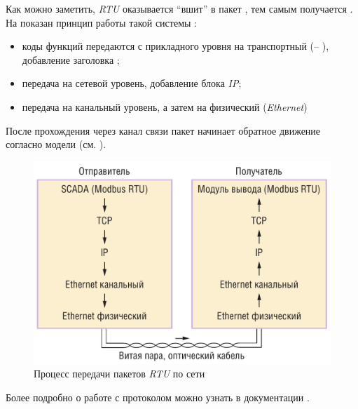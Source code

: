 Как можно заметить, \mb \textit{RTU} оказывается ``вшит'' в пакет \tcp, тем самым получается \mb \tcp. На  показан принцип работы такой системы \cite{__2010}:
\begin{itemize}
	\item коды функций передаются с прикладного уровня на транспортный (\mb -- \tcp), добавление заголовка \tcp;
	\item передача на сетевой уровень, добавление блока \textit{IP};
	\item передача на канальный уровень, а затем на физический (\textit{Ethernet})
\end{itemize}
После прохождения через канал связи пакет начинает обратное движение согласно модели \osi (см. ). 
\begin{figure}[h]
	\centering
	\includegraphics[width=0.7\linewidth]{images/modbus_tcp}
	\caption{Процесс передачи пакетов \mb \textit{RTU} по сети \tcp}
	\label{fig:modbustcp_ip}
\end{figure}


Более подробно о работе с протоколом \mb{} можно узнать в документации \cite{swales_open_1999}. 